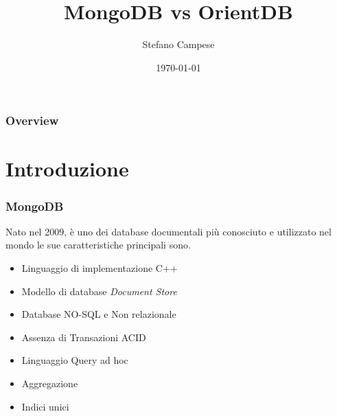 \documentclass{beamer}
\title[MongoDB vs OrientDB]{MongoDB vs OrientDB} %
\author{Stefano Campese} %
\date{\today} %
\begin{document}
\begin{frame}
\titlepage %
\end{frame}

\begin{frame}
\frametitle{Overview} %
\tableofcontents %
\end{frame}


\section{Introduzione} %


\begin{frame}
\frametitle{MongoDB}
Nato nel 2009, è uno dei database documentali più conosciuto e utilizzato nel mondo le sue caratteristiche principali sono.
\begin{itemize}
\item Linguaggio di implementazione C++
\item Modello di database \emph{Document Store}
\item Database NO-SQL e Non relazionale
\item Assenza di Transazioni ACID
\item Linguaggio Query ad hoc
\item Aggregazione
\item Indici unici
\end{itemize}
\end{frame}
\end{document}
